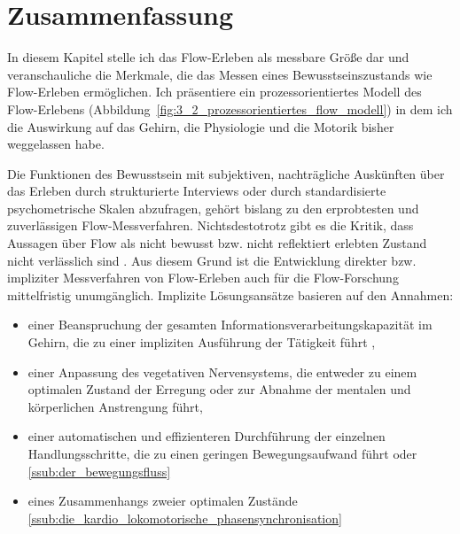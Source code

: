

\section{Zusammenfassung} 

\label{sec:zusammenfassung_3}

In diesem Kapitel stelle ich das Flow-Erleben als messbare Größe dar und veranschauliche die Merkmale, die das Messen eines Bewusstseinszustands wie Flow-Erleben ermöglichen. Ich präsentiere ein prozessorientiertes Modell des Flow-Erlebens (Abbildung~\ref{fig:3_2_prozessorientiertes_flow_modell}) in dem ich die Auswirkung auf das Gehirn, die Physiologie und die Motorik bisher weggelassen habe. 

Die Funktionen des Bewusstsein mit subjektiven, nachträgliche Auskünften über das Erleben durch strukturierte Interviews oder durch standardisierte psychometrische Skalen abzufragen, gehört bislang zu den erprobtesten und zuverlässigen Flow-Messverfahren. Nichtsdestotrotz gibt es die Kritik, dass Aussagen über Flow als nicht bewusst bzw. nicht reflektiert erlebten Zustand nicht verlässlich sind \citep{Henk2014}. Aus diesem Grund ist die Entwicklung direkter bzw. impliziter Messverfahren von Flow-Erleben auch für die Flow-Forschung mittelfristig unumgänglich. Implizite Lösungsansätze basieren auf den Annahmen: 
\begin{itemize}
	
	\item einer Beanspruchung der gesamten Informationsverarbeitungskapazität im Gehirn, die zu einer impliziten Ausführung der Tätigkeit führt \citet{Dietrich2004},
	
	\item einer Anpassung des vegetativen Nervensystems, die entweder zu einem optimalen Zustand der Erregung \citep{Peifer2014} oder zur Abnahme der mentalen und körperlichen Anstrengung \citep{deManzano2010} führt,
	
	\item einer automatischen und effizienteren Durchführung der einzelnen Handlungsschritte, die zu einen geringen Bewegungsaufwand führt oder \ref{ssub:der_bewegungsfluss}
	
	\item eines Zusammenhangs zweier optimalen Zustände \ref{ssub:die_kardio_lokomotorische_phasensynchronisation}
\end{itemize}

